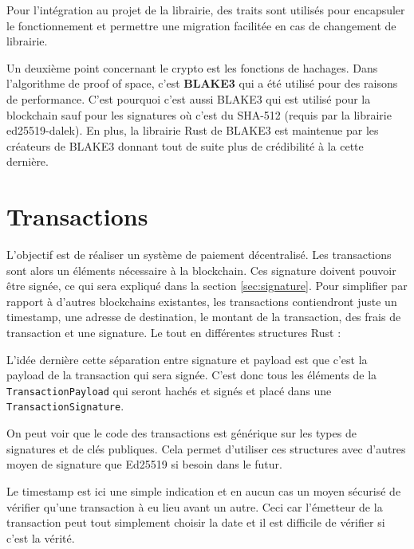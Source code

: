 Pour l'intégration au projet de la librairie, des traits sont utilisés pour encapsuler le fonctionnement et permettre une migration facilitée en cas de changement de librairie.

Un deuxième point concernant le crypto est les fonctions de hachages. Dans l'algorithme de proof of space, c'est \textbf{BLAKE3} qui a été utilisé pour des raisons de performance. C'est pourquoi c'est aussi BLAKE3 qui est utilisé pour la blockchain sauf pour les signatures où c'est du SHA-512 (requis par la librairie ed25519-dalek). En plus, la librairie Rust de BLAKE3 est maintenue par les créateurs de BLAKE3 donnant tout de suite plus de crédibilité à la cette dernière.

\section{Transactions}

L'objectif est de réaliser un système de paiement décentralisé. Les transactions sont alors un éléments nécessaire à la blockchain. Ces signature doivent pouvoir être signée, ce qui sera expliqué dans la section \ref{sec:signature}. Pour simplifier par rapport à d'autres blockchains existantes, les transactions contiendront juste un timestamp, une adresse de destination, le montant de la transaction, des frais de transaction et une signature. Le tout en différentes structures Rust :


L'idée dernière cette séparation entre signature et payload est que c'est la payload de la transaction qui sera signée. C'est donc tous les éléments de la \verb|TransactionPayload| qui seront hachés et signés et placé dans une \verb|TransactionSignature|.


On peut voir que le code des transactions est générique sur les types de signatures et de clés publiques. Cela permet d'utiliser ces structures avec d'autres moyen de signature que Ed25519 si besoin dans le futur.


Le timestamp est ici une simple indication et en aucun cas un moyen sécurisé de vérifier qu'une transaction à eu lieu avant un autre. Ceci car l'émetteur de la transaction peut tout simplement choisir la date et il est difficile de vérifier si c'est la vérité.

